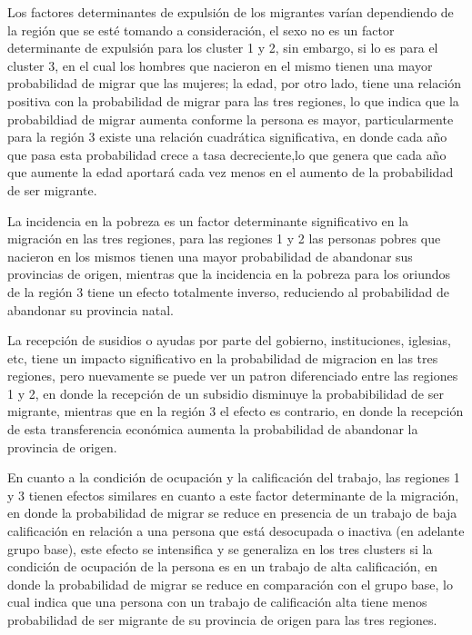 \documentclass[12pt,a4paper]{article}
\begin{document}
Los factores determinantes de expulsión de los migrantes varían dependiendo de la región que se esté tomando a consideración, el sexo no es un factor determinante de expulsión para los cluster 1 y 2, sin embargo, si lo es para el cluster 3, en el cual los hombres que nacieron en el mismo tienen una mayor probabilidad de migrar que las mujeres; la edad, por otro lado, tiene una relación positiva con la probabilidad de migrar para las tres regiones, lo que indica que la probabildiad de migrar aumenta conforme la persona es mayor, particularmente para la región 3 existe una relación cuadrática significativa, en donde cada año que pasa esta probabilidad crece a tasa decreciente,lo que genera que cada año que aumente la edad aportará cada vez menos en el aumento de  la probabilidad de ser migrante.

La incidencia en la pobreza es un factor determinante significativo en la migración en las tres regiones, para las regiones 1 y 2 las personas pobres que nacieron en los mismos tienen una mayor probabilidad de abandonar sus provincias de origen, mientras que la incidencia en la pobreza para los oriundos de la región 3 tiene un efecto totalmente inverso, reduciendo al probabilidad de abandonar su provincia natal.

La recepción de susidios o ayudas por parte del gobierno, instituciones, iglesias, etc, tiene un impacto significativo en la probabilidad de migracion en las tres regiones, pero nuevamente se puede ver un patron diferenciado entre las regiones 1 y 2, en donde la recepción de un subsidio disminuye la probabibilidad de ser migrante, mientras que en la región 3 el efecto es contrario, en donde la recepción de esta transferencia económica aumenta la probabilidad de abandonar la provincia de origen.

En cuanto a la condición de ocupación y la calificación del trabajo, las regiones 1 y 3 tienen efectos similares en cuanto a este factor determinante de la migración, en donde la probabilidad de migrar se reduce en presencia de un trabajo de baja calificación en relación a una persona que está desocupada o inactiva (en adelante grupo base), este efecto se intensifica y se generaliza en los tres clusters si la condición de ocupación de la persona es en un trabajo de alta calificación, en donde la probabilidad de migrar se reduce en comparación con el grupo base, lo cual indica que una persona con un trabajo de calificación alta tiene menos probabilidad de ser migrante de su provincia de origen para las tres regiones.
\end{document}
